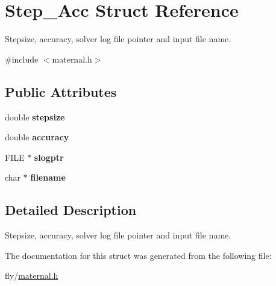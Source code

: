 \hypertarget{structStep__Acc}{
\section{Step\_\-Acc Struct Reference}
\label{structStep__Acc}
}


Stepsize, accuracy, solver log file pointer and input file name.  


{\ttfamily \#include $<$maternal.h$>$}\subsection*{Public Attributes}
\begin{DoxyCompactItemize}
\item 
\hypertarget{structStep__Acc_a0af3f1142d17b2a837cc2e8c0cbe1a54}{
double {\bfseries stepsize}}
\label{structStep__Acc_a0af3f1142d17b2a837cc2e8c0cbe1a54}

\item 
\hypertarget{structStep__Acc_ab75b6fb2de5bb1c2b378cb7061df2994}{
double {\bfseries accuracy}}
\label{structStep__Acc_ab75b6fb2de5bb1c2b378cb7061df2994}

\item 
\hypertarget{structStep__Acc_abb9615eba18f8de34348405ae153b778}{
FILE $\ast$ {\bfseries slogptr}}
\label{structStep__Acc_abb9615eba18f8de34348405ae153b778}

\item 
\hypertarget{structStep__Acc_a37a8402e0f09d21be9a20c5818f672f0}{
char $\ast$ {\bfseries filename}}
\label{structStep__Acc_a37a8402e0f09d21be9a20c5818f672f0}

\end{DoxyCompactItemize}


\subsection{Detailed Description}
Stepsize, accuracy, solver log file pointer and input file name. 

The documentation for this struct was generated from the following file:\begin{DoxyCompactItemize}
\item 
fly/\hyperlink{maternal_8h}{maternal.h}\end{DoxyCompactItemize}
